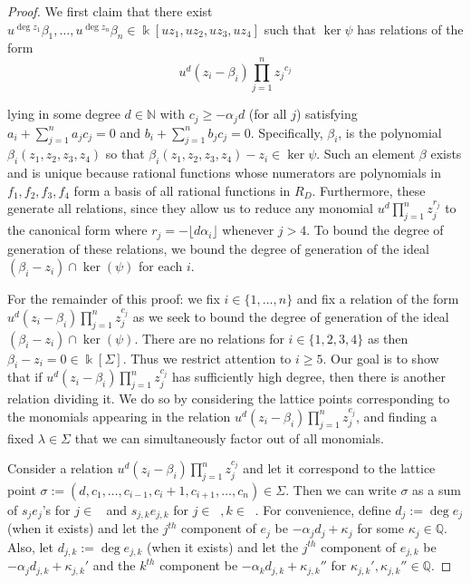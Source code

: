 \documentclass{amsart}
\theoremstyle{plain}
\theoremstyle{definition}
\theoremstyle{remark}
\numberwithin{equation}{subsection}
\newcommand\bq{{\mathbb Q}}
\newcommand\bk{{\Bbbk}}
\newcommand\bida{a}
\newcommand\bidb{b}
\DeclareMathOperator{\Te}{T_=}
\DeclareMathOperator{\Tp}{T_+}
\DeclareMathOperator{\Tm}{T_-}
\begin{document}
\begin{proof}
We first claim that there exist $u^{\deg z_1}\beta_1, \ldots, u^{\deg z_n} \beta_n\in \bk[uz_1, uz_2, uz_3, uz_4]$
such that $\ker \psi$ has relations of the form
\[
	u^d(z_i - \beta_i)\prod_{j=1}^n {z_j}^{c_{j}}
\]

\noindent
lying in some degree $d \in \mathbb{N}$
with $c_j \ge -\alpha_j d$ (for all $j$) satisfying $\bida_i + \sum_{j = 1}
^n \bida_j c_j = 0$ and $\bidb_i + \sum_{j=1}^n \bidb_j c_j = 0$.
Specifically, $\beta_i$,
is the polynomial $\beta_i(z_1,z_2,z_3,z_4)$ so that
$\beta_i(z_1,z_2,z_3,z_4) - z_i \in \ker \psi$. Such an element
$\beta$ exists and is unique because rational functions
whose numerators are polynomials in $f_1, f_2, f_3, f_4$ form a basis
of all rational functions in $R_D$. Furthermore, these
generate all relations, since they allow us to reduce any monomial $u^d\prod_{j =
1}^n z_j^{r_j}$ to the canonical form where $r_j = -\lfloor d \alpha_i
\rfloor$ whenever $j > 4$. To bound the degree of generation of these relations,
we bound the degree of generation of the ideal $(\beta_i - z_i) \cap
\ker(\psi)$ for each $i$.

For the remainder of this proof: we fix $i \in \{1, \ldots,
n\}$ and fix a relation of the form $u^d (z_i - \beta_i) \prod_{j =
1}^n z_j^{c_j}$ as we seek to bound the degree of generation of the
ideal $(\beta_i - z_i) \cap \ker(\psi)$. There are no
relations for $i\in \{1, 2, 3, 4\}$ as then $\beta_i - z_i = 0 \in
\bk[\Sigma]$. Thus we restrict attention to $i \ge 5$. Our goal is
to show that if $u^d(z_i - \beta_i)\prod_{j=1}^n z_j^{c_j}$ has
sufficiently high degree, then there is another relation dividing
it. We do so by considering the lattice points corresponding to the
monomials appearing in the relation $u^d(z_i - \beta_i)\prod_{j=1}^
n z_j^{c_j}$, and finding a fixed $\lambda\in \Sigma$ that we can
simultaneously factor out of all monomials.


Consider a relation $u^d(z_i - \beta_i)\prod_{j=1}^n z_j^{c_j}$ and
let it correspond to the lattice point $\sigma := (d, c_1, \ldots,
c_{i-1}, c_{i}+1, c_{i+1}, \ldots, c_n) \in \Sigma$.
Then we can write $\sigma$ as a sum of $s_j e_j$'s for $j\in
\Te$ and $s_{j,k}e_{j,k}$ for $j\in \Tp, k\in \Tm$.  
For convenience, define $d_j := \deg e_j$ (when it exists) and let the $j^{th}$
component of $e_j$ be $-\alpha_j d_j + \kappa_j$ for some $\kappa_j \in \bq$. Also, let $d_{j,k} := \deg e_{j,k}$ (when it exists) and let the $j^{th}$ component of $e_{j,k}$ be $-\alpha_j d_{j,k} + \kappa_{j,k}'$ and the $k^{th}$
component be $-\alpha_k d_{j,k} + \kappa_{j,k}''$ for $\kappa_{j,k}', \kappa_{j,k}'' \in \bq$.


\end{proof}
\end{document}

